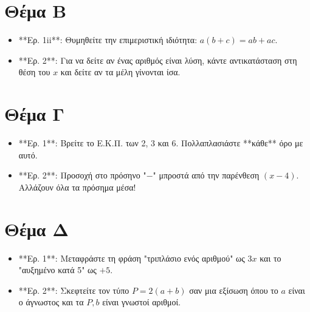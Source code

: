 \documentclass[11pt,a4paper,modern]{FFExercises}
\begin{document}

\section*{Θέμα Β}
\begin{itemize}
    \item **Ερ. 1ii**: Θυμηθείτε την επιμεριστική ιδιότητα: $a(b+c) = ab + ac$.
    \item **Ερ. 2**: Για να δείτε αν ένας αριθμός είναι λύση, κάντε αντικατάσταση στη θέση του $x$ και δείτε αν τα μέλη γίνονται ίσα.
\end{itemize}

\section*{Θέμα Γ}
\begin{itemize}
    \item **Ερ. 1**: Βρείτε το Ε.Κ.Π. των 2, 3 και 6. Πολλαπλασιάστε **κάθε** όρο με αυτό.
    \item **Ερ. 2**: Προσοχή στο πρόσηνο "$-$" μπροστά από την παρένθεση $(x - 4)$. Αλλάζουν όλα τα πρόσημα μέσα!
\end{itemize}

\section*{Θέμα Δ}
\begin{itemize}
    \item **Ερ. 1**: Μεταφράστε τη φράση "τριπλάσιο ενός αριθμού" ως $3x$ και το "αυξημένο κατά 5" ως $+5$.
    \item **Ερ. 2**: Σκεφτείτε τον τύπο $P = 2(a + b)$ σαν μια εξίσωση όπου το $a$ είναι ο άγνωστος και τα $P, b$ είναι γνωστοί αριθμοί.
\end{itemize}
\end{document}
